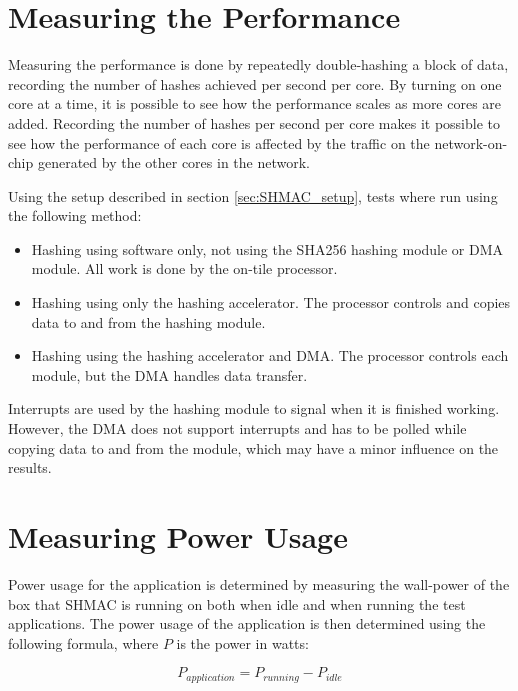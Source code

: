 \section{Measuring the Performance}

Measuring the performance is done by repeatedly double-hashing a block of data, recording the
number of hashes achieved per second per core. By turning on one core at a time, it
is possible to see how the performance scales as more cores are added. Recording
the number of hashes per second per core makes it possible to see how the performance
of each core is affected by the traffic on the network-on-chip generated by the other
cores in the network.

Using the setup described in section \ref{sec:SHMAC_setup}, tests where run using the
following method:

\begin{itemize}
    \item Hashing using software only, not using the SHA256 hashing module or DMA module.
    All work is done by the on-tile processor.
    \item Hashing using only the hashing accelerator.
    The processor controls and copies data to and from the hashing module.
    \item Hashing using the hashing accelerator and DMA.
    The processor controls each module, but the DMA handles data transfer.
\end{itemize}

Interrupts are used by the hashing module to signal when it is finished working. However,
the DMA does not support interrupts and has to be polled while copying data to and from
the module, which may have a minor influence on the results.

\section{Measuring Power Usage}

Power usage for the application is determined by measuring the wall-power of the box
that SHMAC is running on both when idle and when running the test applications. The
power usage of the application is then determined using the following formula, where
$P$ is the power in watts:

\[P_{application} = P_{running} - P_{idle}\]


